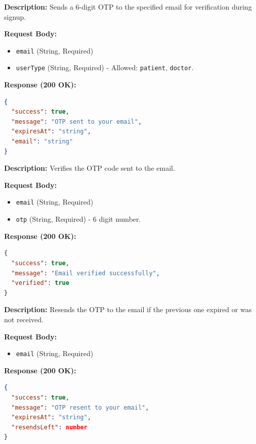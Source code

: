 \documentclass{article}
\begin{document}
\begin{tcolorbox}[title=\textcolor{accent}{POST} /api/otp/send]
\textbf{Description:} Sends a 6-digit OTP to the specified email for verification during signup.

\vspace{0.5em}
\textbf{Request Body:}
\begin{itemize}
    \item \texttt{email} (String, Required)
    \item \texttt{userType} (String, Required) - Allowed: \texttt{patient}, \texttt{doctor}.
\end{itemize}

\vspace{0.5em}
\textbf{Response (200 OK):}
\begin{lstlisting}[language=json]
{
  "success": true,
  "message": "OTP sent to your email",
  "expiresAt": "string",
  "email": "string"
}
\end{lstlisting}
\end{tcolorbox}

\begin{tcolorbox}[title=\textcolor{accent}{POST} /api/otp/verify]
\textbf{Description:} Verifies the OTP code sent to the email.

\vspace{0.5em}
\textbf{Request Body:}
\begin{itemize}
    \item \texttt{email} (String, Required)
    \item \texttt{otp} (String, Required) - 6 digit number.
\end{itemize}

\vspace{0.5em}
\textbf{Response (200 OK):}
\begin{lstlisting}[language=json]
{
  "success": true,
  "message": "Email verified successfully",
  "verified": true
}
\end{lstlisting}
\end{tcolorbox}

\begin{tcolorbox}[title=\textcolor{accent}{POST} /api/otp/resend]
\textbf{Description:} Resends the OTP to the email if the previous one expired or was not received.

\vspace{0.5em}
\textbf{Request Body:}
\begin{itemize}
    \item \texttt{email} (String, Required)
\end{itemize}

\vspace{0.5em}
\textbf{Response (200 OK):}
\begin{lstlisting}[language=json]
{
  "success": true,
  "message": "OTP resent to your email",
  "expiresAt": "string",
  "resendsLeft": number
}
\end{lstlisting}
\end{tcolorbox}
\end{document}
